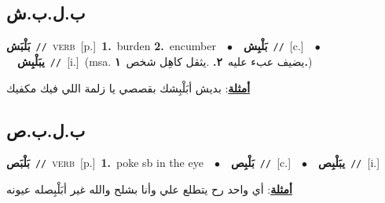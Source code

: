 \documentclass[10pt,a4paper,twoside]{article} %
\begin{document}
\begin{multicols}{2}
\vspace{-3mm}
\subsection*{\color{blue}\foreignlanguage{arabic}{ب.ل.ب.ش}\color{blue}{}} 

{\setlength\topsep{0pt}\textbf{\foreignlanguage{arabic}{بَلْبَش}}\ {\color{gray}\texttt{//}\color{black}}\ \textsc{verb}\ [p.]\ \textbf{1.}~burden  \textbf{2.}~encumber\ \ $\bullet$\ \ \setlength\topsep{0pt}\textbf{\foreignlanguage{arabic}{بَلْبِش}}\ {\color{gray}\texttt{//}\color{black}}\ [c.]\ \ $\bullet$\ \ \setlength\topsep{0pt}\textbf{\foreignlanguage{arabic}{يبَلْبِش}}\ {\color{gray}\texttt{//}\color{black}}\ [i.]\ \color{gray}(msa. \foreignlanguage{arabic}{يضيف عبء عليه}~\foreignlanguage{arabic}{\textbf{٢.}}  .\foreignlanguage{arabic}{يثقل كاهِل شخص}~\foreignlanguage{arabic}{\textbf{١.}})\color{black}\  \begin{flushright}\color{gray}\foreignlanguage{arabic}{\textbf{\underline{\foreignlanguage{arabic}{أمثلة}}}: بديش أبَلْبِشك بقصصي يا زلمة اللي فيك مكفيك}\end{flushright}\color{black}} \vspace{2mm}

\vspace{-3mm}
\subsection*{\color{blue}\foreignlanguage{arabic}{ب.ل.ب.ص}\color{blue}{}} 

{\setlength\topsep{0pt}\textbf{\foreignlanguage{arabic}{بَلْبَص}}\ {\color{gray}\texttt{//}\color{black}}\ \textsc{verb}\ [p.]\ \textbf{1.}~poke sb in the eye\ \ $\bullet$\ \ \setlength\topsep{0pt}\textbf{\foreignlanguage{arabic}{بَلْبِص}}\ {\color{gray}\texttt{//}\color{black}}\ [c.]\ \ $\bullet$\ \ \setlength\topsep{0pt}\textbf{\foreignlanguage{arabic}{يبَلْبِص}}\ {\color{gray}\texttt{//}\color{black}}\ [i.]\  \begin{flushright}\color{gray}\foreignlanguage{arabic}{\textbf{\underline{\foreignlanguage{arabic}{أمثلة}}}: أي واحد رح يتطلع علي وأنا بشلح والله غير أبَلْبِصله عيونه}\end{flushright}\color{black}} \vspace{2mm}


\end{multicols}
\end{document}
